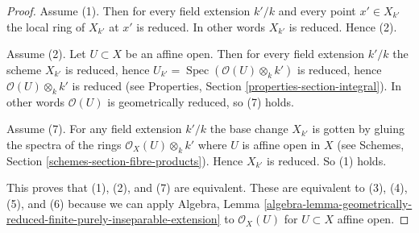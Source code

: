 \documentclass[10pt,a4paper]{amsart}
\theoremstyle{plain}
\theoremstyle{definition}
\theoremstyle{remark}
\numberwithin{equation}{subsection}
\def\Spec{\mathop{\mathrm{Spec}}}
\begin{document}
\begin{proof}
Assume (1). Then for every field extension $k'/k$ and
every point $x' \in X_{k'}$ the local ring of $X_{k'}$ at $x'$
is reduced. In other words $X_{k'}$ is reduced. Hence (2).

\medskip\noindent
Assume (2). Let $U \subset X$ be an affine open. Then for
every field extension $k'/k$ the scheme $X_{k'}$ is reduced, hence
$U_{k'} = \Spec(\mathcal{O}(U)\otimes_k k')$ is reduced,
hence $\mathcal{O}(U)\otimes_k k'$ is reduced (see Properties,
Section \ref{properties-section-integral}). In other words
$\mathcal{O}(U)$ is geometrically reduced, so (7) holds.

\medskip\noindent
Assume (7). For any field extension $k'/k$ the base
change $X_{k'}$ is gotten by gluing the spectra of the
rings $\mathcal{O}_X(U) \otimes_k k'$ where $U$ is affine open
in $X$ (see Schemes, Section \ref{schemes-section-fibre-products}).
Hence $X_{k'}$ is reduced. So (1) holds.

\medskip\noindent
This proves that (1), (2), and (7) are equivalent. These are equivalent
to (3), (4), (5), and (6) because we can apply Algebra, Lemma
\ref{algebra-lemma-geometrically-reduced-finite-purely-inseparable-extension}
to $\mathcal{O}_X(U)$ for $U \subset X$ affine open.
\end{proof}
\end{document}
